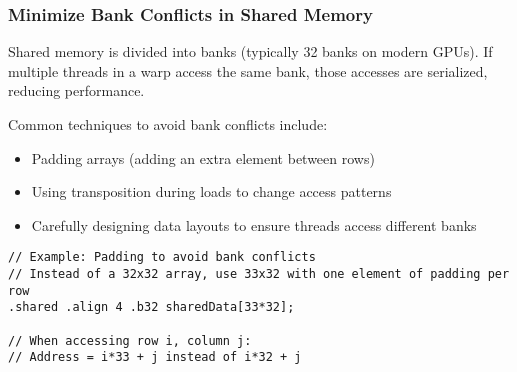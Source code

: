 \subsubsection{Minimize Bank Conflicts in Shared Memory}

Shared memory is divided into banks (typically 32 banks on modern GPUs). If multiple threads in a warp access the same bank, those accesses are serialized, reducing performance.

Common techniques to avoid bank conflicts include:

\begin{itemize}
    \item Padding arrays (adding an extra element between rows)
    \item Using transposition during loads to change access patterns
    \item Carefully designing data layouts to ensure threads access different banks
\end{itemize}

\begin{lstlisting}[style=ptx]
// Example: Padding to avoid bank conflicts
// Instead of a 32x32 array, use 33x32 with one element of padding per row
.shared .align 4 .b32 sharedData[33*32];

// When accessing row i, column j:
// Address = i*33 + j instead of i*32 + j
\end{lstlisting}

